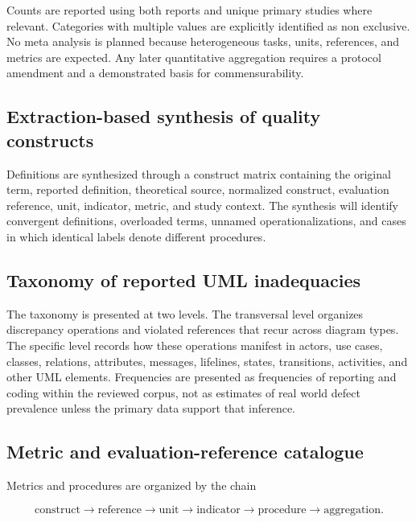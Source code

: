Counts are reported using both reports and unique primary studies where relevant. Categories with multiple values are explicitly identified as non exclusive. No meta analysis is planned because heterogeneous tasks, units, references, and metrics are expected. Any later quantitative aggregation requires a protocol amendment and a demonstrated basis for commensurability.

\subsection{Extraction-based synthesis of quality constructs}

Definitions are synthesized through a construct matrix containing the original term, reported definition, theoretical source, normalized construct, evaluation reference, unit, indicator, metric, and study context. The synthesis will identify convergent definitions, overloaded terms, unnamed operationalizations, and cases in which identical labels denote different procedures.

\subsection{Taxonomy of reported UML inadequacies}

The taxonomy is presented at two levels. The transversal level organizes discrepancy operations and violated references that recur across diagram types. The specific level records how these operations manifest in actors, use cases, classes, relations, attributes, messages, lifelines, states, transitions, activities, and other UML elements. Frequencies are presented as frequencies of reporting and coding within the reviewed corpus, not as estimates of real world defect prevalence unless the primary data support that inference.

\subsection{Metric and evaluation-reference catalogue}

Metrics and procedures are organized by the chain

\begin{equation}
\text{construct} \rightarrow \text{reference} \rightarrow \text{unit} \rightarrow \text{indicator} \rightarrow \text{procedure} \rightarrow \text{aggregation}.
\label{eq:protocol_metrology_chain}
\end{equation}

